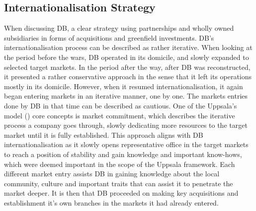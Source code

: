 \documentclass[11pt,a4paper]{article}
\begin{document}
{{{\subsection{Internationalisation Strategy}
\vspace{-1mm}
\label{int_strategy}
 \par
When discussing DB, a clear strategy using partnerships and wholly owned subsidiaries in forms of acquisitions and greenfield investments. DB's internationalisation process can be described as rather iterative. When looking at the period before the wars, DB operated in its domicile, and slowly expanded to selected target markets. In the period after the way, after DB was reconstructed, it presented a rather conservative approach in the sense that it left its operations mostly in its domicile. However, when it resumed internationalisation, it again began entering markets in an iterative manner, one by one. The markets entries done by DB in that time can be described as cautious. One of the Uppsala's model (\citeyear{johansonInternationalizationProcessFirm1977}) core concepts is market commitment, which describes the iterative process a company goes through, slowly dedicating more resources to the target market until it is fully established. This approach aligns with DB internationalisation as it slowly opens representative office in the target markets to reach a position of stability and gain knowledge and important know-hows, which were deemed important in the scope of the Uppsala framework. Each different market entry assists DB in gaining knowledge about the local community, culture and important traits that can assist it to penetrate the market deeper. It is then that DB proceeded on making key acquisitions and establishment it's own branches in the markets it had already entered. \par 
}}}
\end{document}
